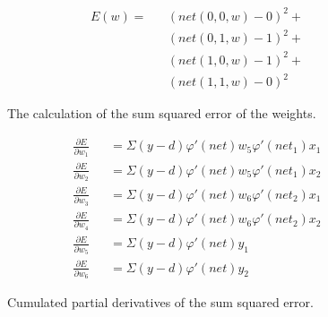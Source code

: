 \documentclass{article}
\begin{document}
\begin{figure}[H]
	\centering
	\begin{eqnarray}
		E(w) = && (net(0, 0, w) - 0)^2 + \\
				&& (net(0, 1, w) - 1)^2 + \\
				&& (net(1, 0, w) - 1)^2 + \\
				&& (net(1, 1, w) - 0)^2
	\end{eqnarray}
	\caption{The calculation of the sum squared error of the weights.}
	\label{fig:sse}
\end{figure}

\begin{figure}[H]
	\centering
	\begin{eqnarray}
		\frac{\partial E}{\partial w_1} &&= \Sigma{(y - d)\varphi'(net)w_5\varphi'(net_1)x_1} \\
		\frac{\partial E}{\partial w_2} &&= \Sigma{(y - d)\varphi'(net)w_5\varphi'(net_1)x_2} \\
		\frac{\partial E}{\partial w_3} &&= \Sigma{(y - d)\varphi'(net)w_6\varphi'(net_2)x_1} \\
		\frac{\partial E}{\partial w_4} &&= \Sigma{(y - d)\varphi'(net)w_6\varphi'(net_2)x_2} \\
		\frac{\partial E}{\partial w_5} &&= \Sigma{(y - d)\varphi'(net)y_1} \\
		\frac{\partial E}{\partial w_6} &&= \Sigma{(y - d)\varphi'(net)y_2}
	\end{eqnarray}
	\caption{Cumulated partial derivatives of the sum squared error.}
	\label{fig:dsse}
\end{figure}



\end{document}
